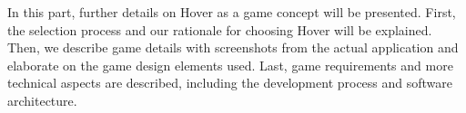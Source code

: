 In this part, further details on Hover as a game concept will be presented. First, the selection process and our rationale for choosing Hover will be explained. Then, we describe game details with screenshots from the actual application and elaborate on the game design elements used. Last, game requirements and more technical aspects are described, including the development process and software architecture.













